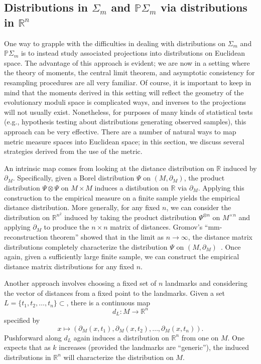 \documentclass[a4paper,11pt]{article}
\begin{document}
\subsection{Distributions in $\Sigma_m$ and $\mathbb{P}\Sigma_m$ via distributions in $\mathbb{R}^n$}

One way to grapple with the difficulties in dealing with distributions on $\Sigma_m$ and $\mathbb{P}\Sigma_m$ is to instead study associated projections into distributions on Euclidean space.
The advantage of this approach is evident; we are now in a setting where the theory of moments, the central limit theorem, and asymptotic consistency for resampling procedures are all very familiar.
Of course, it is important to keep in mind that the moments derived in this setting will reflect the geometry of the evolutionary moduli space is complicated ways, and inverses to the projections will not usually exist.
Nonetheless, for purposes of many kinds of statistical tests (e.g., hypothesis testing about distributions generating observed samples), this approach can be very effective.
There are a number of natural ways to map metric measure spaces into Euclidean space; in this section, we discuss several strategies derived from the use of the metric.

An intrinsic map comes from looking at the distance distribution on $\mathbb{R}$ induced by $\partial_M$.
Specifically, given a Borel distribution $\Psi$ on $(M, \partial_M)$, the product distribution $\Psi \otimes \Psi$ on $M \times M$ induces a distibution on $\mathbb{R}$ via $\partial_M$.
Applying this construction to the empirical measure on a finite sample yields the empirical distance distribution.
More generally, for any fixed $n$, we can consider the distribution on $\mathbb{R}^{n^2}$ induced by taking the product distribution $\Psi^{\otimes n}$ on $M^{\times n}$ and applying $\partial_M$ to produce the $n \times n$ matrix of distances.
Gromov's ``mm-reconstruction theorem'' showed that in the limit as $n \to \infty$, the distance matrix distributions completely characterize the distribution $\Psi$ on $(M, \partial_M)$~\cite{gromov1981}.
Once again, given a sufficiently large finite sample, we can construct the empirical distance matrix distributions for any fixed $n$.

Another approach involves choosing a fixed set of $n$ landmarks and considering the vector of distances from a fixed point to the landmarks.
Given a set $L = \{t_1, t_2, \ldots, t_n\} \subset $, there is a continuous map
\[
d_L \colon M \to \mathbb{R}^n
\]
specified by
\[
x \mapsto (\partial_M(x,t_1), \partial_M(x,t_2), \ldots, \partial_M(x,t_n)).
\]
Pushforward along $d_L$ again induces a distribution on $\mathbb{R}^n$ from one on $M$.
One expects that as $k$ increases (provided the landmarks are ``generic''), the induced distributions in $\mathbb{R}^n$ will characterize the distribution on $M$.
\end{document}
